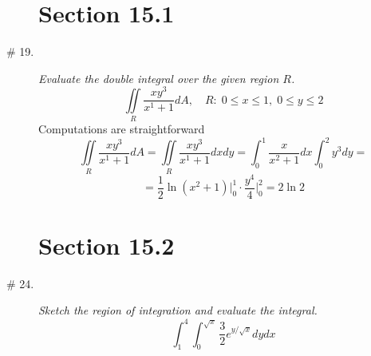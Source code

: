 \documentclass[8pt]{article} %
\begin{document}
\begin{description}
\section{Section 15.1}
	\item[\# 19.]{{\it Evaluate the double integral over the given region $R$.}
		\[\iint\limits_R \frac{xy^3}{x^1+1}dA,\quad R:\;0\leq x\leq1,\;0\leq y\leq2\]
		Computations are straightforward
		\[\iint\limits_R \frac{xy^3}{x^1+1}dA=\iint\limits_R \frac{xy^3}{x^1+1}dxdy=\int_0^1\frac{x}{x^2+1}dx\int_0^2y^3dy=\]
		\[=\frac{1}{2}\ln(x^2+1)\bigg|_0^1\cdot \frac{y^4}{4}\bigg|_0^2=2\ln2\]
		}
\section{Section 15.2}
	\item[\# 24.]{{\it Sketch the region of integration and evaluate the integral.}
		\[\int_1^4\int_0^{\sqrt{x}}\frac{3}{2}e^{y/\sqrt{x}}dydx\]

		}
\end{description}
\end{document}
